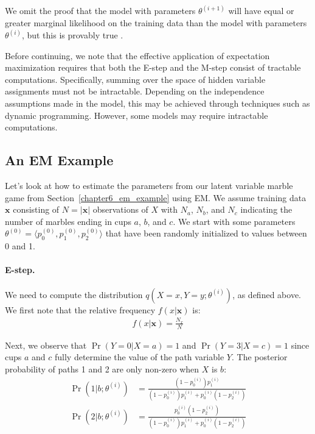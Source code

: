 \noindent We omit the proof that the model with parameters
$\theta^{(i+1)}$ will have equal or greater marginal likelihood on the
training data than the model with parameters $\theta^{(i)}$, but this
is provably true \cite{Jelinek_1997}.

Before continuing, we note that the effective application of
expectation maximization requires that both the E-step and the M-step
consist of tractable computations.  Specifically, summing over the
space of hidden variable assignments must not be intractable.
Depending on the independence assumptions made in the model, this may
be achieved through techniques such as dynamic programming.  However,
some models may require intractable computations.

\subsection{An EM Example}

Let's look at how to estimate the parameters from our latent variable
marble game from Section~\ref{chapter6_em_example} using EM.  We
assume training data $\textbf{x}$ consisting of $N=|\textbf{x}|$
observations of $X$ with $N_a$, $N_b$, and $N_c$ indicating the number
of marbles ending in cups $a$, $b$, and $c$.  We start with some
parameters $\theta^{(0)}=\langle p_0^{(0)}, p_1^{(0)}, p_2^{(0)}
\rangle$ that have been randomly initialized to values between 0 and
1.

\paragraph{\textbf{E-step.}}
We need to compute the distribution $q(X=x,Y=y;\theta^{(i)})$, as
defined above.  We first note that the relative frequency
$f(x|\textbf{x})$ is:
\begin{align}
f(x|\textbf{x}) = \frac{N_x}{N}
\end{align}

\noindent Next, we observe that $\Pr(Y=0|X=a)=1$ and $\Pr(Y=3|X=c)=1$
since cups $a$ and $c$ fully determine the value of the path variable
$Y$.  The posterior probability of paths 1 and 2 are only non-zero
when $X$ is $b$:
\begin{align}
\Pr(1|b;\theta^{(i)}) &= \frac{(1-p_0^{(i)}) p_1^{(i)}}{(1-p_0^{(i)}) p_1^{(i)} + p_0^{(i)} (1-p_2^{(i)})} \\
\Pr(2|b;\theta^{(i)}) &= \frac{p_0^{(i)} (1-p_2^{(i)})}{(1-p_0^{(i)}) p_1^{(i)} + p_0^{(i)} (1-p_2^{(i)})}
\end{align}

